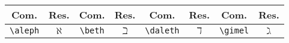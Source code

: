 % 
% 
% 
% 
% 
\begin{tabular}{cc|cc|cc|cc}
    \hline
    Com. & Res. & Com. & Res. & Com. & Res. & Com. & Res. \\ \hline
    \lstinline!\aleph! & $\aleph$ & \lstinline!\beth! & $\beth$ & \lstinline!\daleth! & $\daleth$ & \lstinline!\gimel! & $\gimel$ \\ \hline
\end{tabular}
